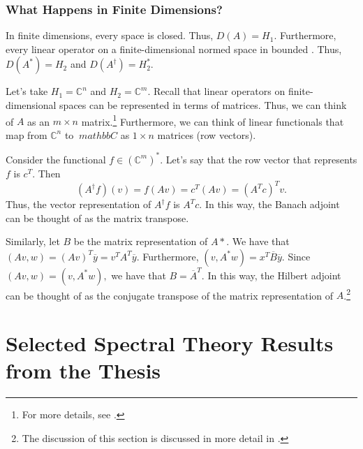\documentclass[12pt,a4paper]{article}
\theoremstyle{boldthm}
\theoremstyle{bolddefn}
\begin{document}
\subsubsection{What Happens in Finite Dimensions?}

In finite dimensions, every space is closed. Thus, $D(A) = H_1.$ Furthermore, every linear operator on a finite-dimensional normed space in bounded \cite[Theorem 2.7-8]{krey}. Thus, $D(A^*) = H_2$ and $D(A^\dagger) = H_2^*.$ 

Let's take $H_1 = \mathbb{C}^n$ and $H_2 = \mathbb{C}^m.$ Recall that linear operators on finite-dimensional
spaces can be represented in terms of matrices. Thus, we can think of $A$ as an $m \times n$ matrix.\footnote{For more details, see \cite[Section 2.9]{krey}.} Furthermore, we can think of linear functionals that map from $\mathbb{C}^n$ to $ \ mathbb {C} $ as $1 \times n$ matrices (row vectors). 

Consider the functional $f \in (\mathbb{C}^{m})^*.$ Let's say that the row vector that represents $f$ is $c^T.$ Then
\begin{equation}
    (A^\dagger f)(v) = f(Av) = c^T (Av) = (A^T c)^T v.
\end{equation}
Thus, the vector representation of $A^\dagger f$ is $A^T c.$
In this way, the Banach adjoint can be thought of as the matrix transpose. 

Similarly, let $B$ be the matrix representation of $A*.$ We have that $(Av, w) = (Av)^T \overline y = v^T A^T \overline y.$ Furthermore, $(v, A^*w) = x^T \overline B \overline y.$ Since $(Av, w) = (v, A^*w),$ we have that $B = \overline A ^T.$ In this way, the Hilbert adjoint can be thought of as the conjugate transpose of the matrix representation of $A$.\footnote{The discussion of this section is discussed in more detail in \cite[Section 4.5]{krey}.}



\section{Selected Spectral Theory Results from the Thesis}
\end{document}
